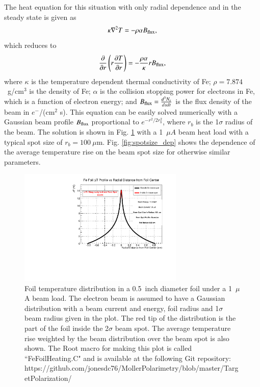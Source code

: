 \documentclass[preprint,12pt]{elsarticle}
\begin{document}
The heat equation for this situation with only radial dependence and in the steady state is given as
\begin{equation}
\kappa\nabla^2T=-\rho\alpha B_{\rm flux},
\end{equation}
which reduces to
\begin{equation}
\label{eq:heat_T_r}
\frac{\partial}{\partial r}\left(r\frac{\partial T}{\partial r}\right)=-\frac{\rho\alpha}{\kappa}rB_{\rm flux},
\end{equation}
where $\kappa$ is the temperature dependent thermal conductivity of Fe; $\rho =7.874$~g/cm$^3$ is the density of Fe; $\alpha$ is the collision stopping power for electrons in Fe, which is a function of electron energy; and $B_{\rm flux}=\frac{d^3N_e}{ds dt} $ is the flux density of the beam in $e^-$/(cm$^2$ s). This equation can be easily solved numerically with a Gaussian beam profile $B_{\rm flux}$ proportional to $e^{-r^2/2r_b^2}$, where $r_{b}$ is the 1$\sigma$ radius of the beam. The solution is shown in Fig. \ref{fig:target_heating} with a 1~$\mu A$ beam heat load with a typical spot size of $r_{b}=100~\mu$m. Fig. \ref{fig:spotsize_dep} shows the dependence of the average temperature rise on the beam spot size for otherwise similar parameters.
\begin{figure}[ht]
\centering
\includegraphics[width=0.7\textwidth]{FeFoilHeatingdT.pdf}
\caption{Foil temperature distribution in a 0.5~inch diameter foil under a 1~$\mu$A beam load. The electron beam is assumed to have a Gaussian distribution with a beam current and energy, foil radius and 1$\sigma$ beam radius given in the plot. The red tip of the distribution is the part of the foil inside the 2$\sigma$ beam spot. The  average temperature rise weighted by the beam distribution over the beam spot is also shown. The {\sc Root} macro for making this plot is called ``FeFoilHeating.C" and is available at the following Git repository: https://github.com/jonesdc76/MollerPolarimetry/blob/master/TargetPolarization/}
\label{fig:target_heating}
\end{figure}
\end{document}
